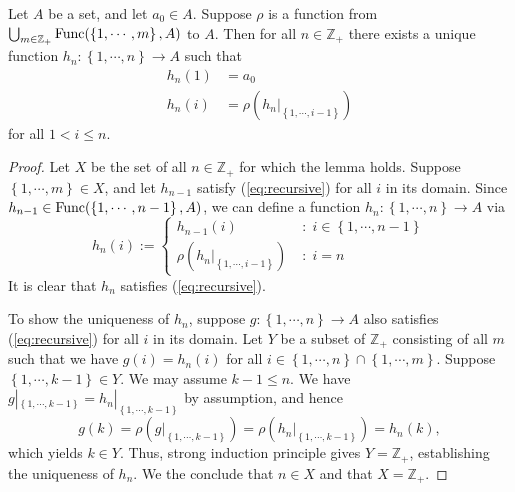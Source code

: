 \documentclass[a4paper,12pt]{article}
\begin{document}
\begin{lem}\label{lem:recursive}
	Let
	\( A \)
	be a set, and let
	\( a_0 \in A \).
	Suppose \( \rho \) is a function from
	\( \bigcup_{m\in \mathbb{Z}_{+}}\mathrm{Func}(\left\{1, \cdots, m \right\},A) \)
	to
	\( A \).
	Then for all \( n \in \mathbb{Z}_{+} \)
	there exists a unique function
	\( h_n: \left\{1, \cdots, n \right\} \to A\)
	such that
	\begin{equation}\label{eq:recursive}
		\begin{split}
			h_n(1)&=a_0\\
			h_n(i)&=\rho \left( h_n |_{\left\{1, \cdots, i-1 \right\}} \right)
		\end{split}
	\end{equation}
	for all
	\( 1<i\le n \).
\end{lem}

\begin{proof}
	Let \( X \) be the set of all
	\( n \in \mathbb{Z}_{+} \)
	for which the lemma holds.
	Suppose \( \left\{1, \cdots, m \right\} \in X\),
	and let \( h_{n-1} \) satisfy (\ref{eq:recursive})
	for all \( i \) in its domain.
	Since
	\( h_{n-1} \in \mathrm{Func}(\left\{1, \cdots, n-1 \right\},A) \),
	we can define a function
	\( h_n:\left\{1, \cdots, n \right\} \to A \)
	via
	\begin{equation*}
		h_n(i):=\begin{cases}
			h_{n-1}(i)                                                 & \;\mathrm{:}\; i \in \left\{ 1,\cdots,n-1 \right\} \\
			\rho \left( h_n |_{\left\{1, \cdots, i-1 \right\}} \right) & \;\mathrm{:}\; i=n
		\end{cases}
	\end{equation*}
	It is clear that \( h_n \) satisfies (\ref{eq:recursive}).
	
	To show the uniqueness of \( h_n \),
	suppose
	\( g: \left\{1, \cdots, n \right\} \to A\)
	also satisfies (\ref{eq:recursive}) for all \( i \) in its domain.
	Let \( Y \) be a subset of \( \mathbb{Z}_{+} \) consisting of all \( m \) such that we have
	\( g(i)=h_n(i) \)
	for all
	\( i \in \left\{1, \cdots, n \right\}\cap \left\{1, \cdots, m \right\} \).
	Suppose
	\( \left\{1, \cdots, k-1 \right\} \in Y \).
	We may assume
	\( k-1 \le n \).
	We have
	\( g|_{\left\{1, \cdots, k-1 \right\}} = h_n|_{\left\{1, \cdots, k-1 \right\}} \)
	by assumption, and hence
	\begin{equation*}
		g(k)
		= \rho \left( g|_{\left\{1, \cdots, k-1 \right\}} \right)
		= \rho \left( h_n|_{\left\{1, \cdots, k-1 \right\}} \right)
		= h_n(k),
	\end{equation*}
	which yields \( k \in Y \).
	Thus, strong induction principle gives \( Y = \mathbb{Z}_{+} \),
	establishing the uniqueness of \(  h_n \).
	We the conclude that \( n \in X \) and that \( X = \mathbb{Z}_{+} \).
\end{proof}
\end{document}
